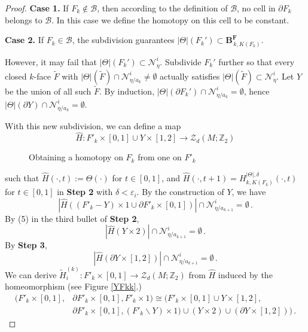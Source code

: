 \documentclass[10pt,a4paper]{amsart}
\begin{document}
\begin{proof}
\textbf{Case 1.} If $F_k \notin \mathcal{B}$, then according to the definition of $\mathcal{B}$, no cell in $\partial F_k$ belongs to $\mathcal{B}$. In this case we define the homotopy on this cell to be constant.

\textbf{Case 2.} If \(F_k\in\mathcal B\), the subdivision guarantees
\(|\Theta|(F_k')\subset \mathbf B^{\mathbf F}_{\,k,K(F_k)}\).

However, it may fail that \(|\Theta|(F_k')\subset\mathcal N^i_\eta\). Subdivide \(F_k'\) further so that every closed \(k\)-face \(\widetilde F\) with \(|\Theta|(\widetilde F)\cap \mathcal N^i_{\eta/a_k}\neq\emptyset\) actually satisfies \(|\Theta|(\widetilde F)\subset \mathcal N^i_\eta\). Let \(Y\) be the union of all such \(\widetilde F\). By induction, \(|\Theta|(\partial F_k')\cap \mathcal N^i_{\eta/a_k}=\emptyset\), hence \(|\Theta|(\partial Y)\cap \mathcal N^i_{\eta/a_k}=\emptyset\).

With this new subdivision, we can define a map 
\begin{equation*}
    \hat H: F'_k \times [0, 1] \cup Y \times [1,2] \rightarrow \mathcal{Z}_d(M; \mathbb{Z}_2) 
\end{equation*}
\begin{figure}
\centering

\caption{Obtaining a homotopy on $F_k$ from one on $F'_k$}
\label{F'Fk}
\end{figure}
such that $\hat H(\cdot, t) := \Theta(\cdot)$ for $t \in [0,1]$, and $\hat H(\cdot, t+1) = H^{|\Theta|, \delta}_{k, K(F_k)}(\cdot, t)$ for $t \in [0,1]$ in \textbf{Step 2} with $\delta < \varepsilon_i$. By the construction of $Y$, we have
\begin{equation*}
    |\hat H((F'_k - Y) \times 1 \cup \partial F'_k \times [0, 1])| \cap \mathcal{N}^i_{\eta/a_{k+1}} = \emptyset\,.
\end{equation*}
By (5) in the third bullet of \textbf{Step 2},
\begin{equation*}
    |\hat H(Y \times 2)| \cap \mathcal{N}^i_{\eta/a_{k+1}} = \emptyset\,.
\end{equation*}
By \textbf{Step 3},
\begin{equation*}
    |\hat H(\partial Y \times [1, 2])| \cap \mathcal{N}^i_{\eta/a_{k+1}} = \emptyset\,.
\end{equation*} 
We can derive $\tilde H^{(k)}_i: F'_k \times [0, 1] \rightarrow \mathcal{Z}_d(M; \mathbb{Z}_2)$ from $\hat H$ induced by the homeomorphism (see Figure \ref{YFkk}.)
\begin{equation*}
    \begin{aligned}
        (F'_k \times [0,1], &\partial F'_k \times [0,1], F'_k \times 1) \cong 
        (F'_k \times [0, 1] \cup Y \times [1,2], \\
        & \partial F'_k \times [0,1], (F'_k\backslash Y)\times 1) \cup \left(Y \times 2\right) \cup \left(\partial Y \times [1,2]\right))\,.
    \end{aligned}            
\end{equation*}
        

\end{proof}
\end{document}
